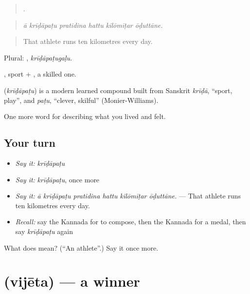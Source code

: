 \begin{quote}
     .
\end{quote}

\begin{quote}
\emph{ā krīḍāpaṭu pratidina hattu kilōmīṭar ōḍuttāne.}
\end{quote}

\begin{quote}
That athlete runs ten kilometres every day.
\end{quote}

Plural: , \emph{krīḍāpaṭugaḷu}.

, sport + , a skilled one.

\begin{cousinweb}
\textbf{} (\emph{krīḍāpaṭu}) is a modern learned compound built from Sanskrit \emph{krīḍā}, \textquotedblleft{}sport, play\textquotedblright{}, and \emph{paṭu}, \textquotedblleft{}clever, skilful\textquotedblright{} (Monier-Williams).
\end{cousinweb}

\begin{grammarlens}[title={What you've built}]
One more word for describing what you lived and felt.
\end{grammarlens}

\subsection*{Your turn}
\begin{itemize}
\raggedright
  \item \emph{Say it:} \emph{krīḍāpaṭu}
  \item \emph{Say it:} \emph{krīḍāpaṭu}, once more
  \item \emph{Say it:} \emph{ā krīḍāpaṭu pratidina hattu kilōmīṭar ōḍuttāne.} — That athlete runs ten kilometres every day.
  \item \emph{Recall:} say the Kannada for to compose, then the Kannada for a medal, then say \emph{krīḍāpaṭu} again
\end{itemize}

\begin{tcolorbox}[breakable,colback=teal!4,colframe=teal!35!black,title={Before you move on}]
What does  mean? (\textquotedblleft{}An athlete\textquotedblright{}.) Say it once more.
\end{tcolorbox}
\section[\texorpdfstring{\kn{ವಿಜೇತ} (vijēta)}{ವಿಜೇತ (vijēta)}]{ (vijēta) — a winner}

